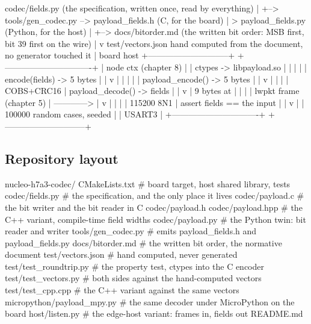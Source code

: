 \begin{asciiart}
  codec/fields.py  (the specification, written once, read by everything)
        |
        +--> tools/gen_codec.py --> payload_fields.h   (C, for the board)
        |                       \-> payload_fields.py  (Python, for the host)
        |
        +--> docs/bitorder.md    (the written bit order: MSB first, bit 39 first on the wire)
                 |
                 v
        test/vectors.json   hand computed from the document, no generator touched it
                 |
   board                                          host
   +-----------------------------+                +-------------------------------+
   | node ctx (chapter 8)        |                | ctypes -> libpayload.so       |
   |   |                         |                |   encode(fields) -> 5 bytes   |
   |   v                         |                |        |                      |
   | payload_encode() -> 5 bytes |                |        v                      |
   |   |                         |   COBS+CRC16   | payload_decode() -> fields    |
   |   v                         |  9 bytes at    |        |                      |
   | lwpkt frame (chapter 5)     | ------------>  |        v                      |
   |   |                         |   115200 8N1   | assert fields == the input    |
   |   v                         |                | 100000 random cases, seeded   |
   | USART3                      |                +-------------------------------+
   +-----------------------------+
\end{asciiart}

\subsection*{Repository layout}

\begin{plaincode}
nucleo-h7a3-codec/
  CMakeLists.txt                  # board target, host shared library, tests
  codec/fields.py                 # the specification, and the only place it lives
  codec/payload.c                 # the bit writer and the bit reader in C
  codec/payload.h
  codec/payload.hpp               # the C++ variant, compile-time field widths
  codec/payload.py                # the Python twin: bit reader and writer
  tools/gen_codec.py              # emits payload_fields.h and payload_fields.py
  docs/bitorder.md                # the written bit order, the normative document
  test/vectors.json               # hand computed, never generated
  test/test_roundtrip.py          # the property test, ctypes into the C encoder
  test/test_vectors.py            # both sides against the hand-computed vectors
  test/test_cpp.cpp               # the C++ variant against the same vectors
  micropython/payload_mpy.py      # the same decoder under MicroPython on the board
  host/listen.py                  # the edge-host variant: frames in, fields out
  README.md
\end{plaincode}

